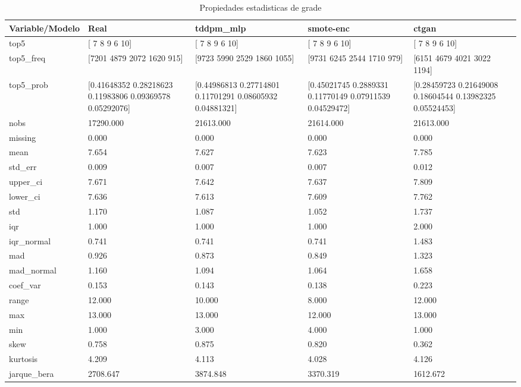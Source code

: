 \begin{table}[H]
\centering
\caption{Propiedades  estadisticas de grade}
\label{table-stats-grade}
\begin{tabular}{|l|m{10em}|m{10em}|m{10em}|m{10em}|}
\hline
 \rowcolor[gray]{0.8}
Variable/Modelo & Real & tddpm\_mlp & smote-enc & ctgan \\
\hline top5 & [ 7  8  9  6 10] & [ 7  8  9  6 10] & [ 7  8  9  6 10] & [ 7  8  9  6 10] \\
\hline top5\_freq & [7201 4879 2072 1620  915] & [9723 5990 2529 1860 1055] & [9731 6245 2544 1710  979] & [6151 4679 4021 3022 1194] \\
\hline top5\_prob & [0.41648352 0.28218623 0.11983806 0.09369578 0.05292076] & [0.44986813 0.27714801 0.11701291 0.08605932 0.04881321] & [0.45021745 0.2889331  0.11770149 0.07911539 0.04529472] & [0.28459723 0.21649008 0.18604544 0.13982325 0.05524453] \\
\hline nobs & 17290.000 & 21613.000 & 21614.000 & 21613.000 \\
\hline missing & 0.000 & 0.000 & 0.000 & 0.000 \\
\hline mean & 7.654 & 7.627 & 7.623 & 7.785 \\
\hline std\_err & 0.009 & 0.007 & 0.007 & 0.012 \\
\hline upper\_ci & 7.671 & 7.642 & 7.637 & 7.809 \\
\hline lower\_ci & 7.636 & 7.613 & 7.609 & 7.762 \\
\hline std & 1.170 & 1.087 & 1.052 & 1.737 \\
\hline iqr & 1.000 & 1.000 & 1.000 & 2.000 \\
\hline iqr\_normal & 0.741 & 0.741 & 0.741 & 1.483 \\
\hline mad & 0.926 & 0.873 & 0.849 & 1.323 \\
\hline mad\_normal & 1.160 & 1.094 & 1.064 & 1.658 \\
\hline coef\_var & 0.153 & 0.143 & 0.138 & 0.223 \\
\hline range & 12.000 & 10.000 & 8.000 & 12.000 \\
\hline max & 13.000 & 13.000 & 12.000 & 13.000 \\
\hline min & 1.000 & 3.000 & 4.000 & 1.000 \\
\hline skew & 0.758 & 0.875 & 0.820 & 0.362 \\
\hline kurtosis & 4.209 & 4.113 & 4.028 & 4.126 \\
\hline jarque\_bera & 2708.647 & 3874.848 & 3370.319 & 1612.672 \\

\end{tabular}
\end{table}
